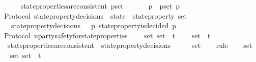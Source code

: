 \begin{isabellebody}
\ \ \isanewline
\ \ \ \ {\isachardoublequoteopen}state{\isacharunderscore}properties{\isacharunderscore}are{\isacharunderscore}consistent\ p{\isacharunderscore}set\ {\isacharequal}\ {\isacharparenleft}{\isasymexists}\ {\isasymsigma}\ {\isasymin}\ {\isasymSigma}{\isachardot}\ {\isasymforall}\ p\ {\isasymin}\ p{\isacharunderscore}set{\isachardot}\ p\ {\isasymsigma}{\isacharparenright}{\isachardoublequoteclose}\isanewline
\isanewline
\isanewline
{}\isamarkupfalse%
\ {\isacharparenleft}\ Protocol{\isacharparenright}\ state{\isacharunderscore}property{\isacharunderscore}decisions\ {\isacharcolon}{\isacharcolon}\ {\isachardoublequoteopen}state\ {\isasymRightarrow}\ state{\isacharunderscore}property\ set{\isachardoublequoteclose}\isanewline
\ \ \ \isanewline
\ \ \ \ {\isachardoublequoteopen}state{\isacharunderscore}property{\isacharunderscore}decisions\ {\isasymsigma}\ {\isacharequal}\ {\isacharbraceleft}p{\isachardot}\ state{\isacharunderscore}property{\isacharunderscore}is{\isacharunderscore}decided\ {\isacharparenleft}p{\isacharcomma}\ {\isasymsigma}{\isacharparenright}{\isacharbraceright}{\isachardoublequoteclose}\isanewline
\isanewline
\isanewline
{}\isamarkupfalse%
\ {\isacharparenleft}\ Protocol{\isacharparenright}\ n{\isacharunderscore}party{\isacharunderscore}safety{\isacharunderscore}for{\isacharunderscore}state{\isacharunderscore}properties\ {\isacharcolon}\isanewline
\ \ {\isachardoublequoteopen}{\isasymforall}\ {\isasymsigma}{\isacharunderscore}set{\isachardot}\ {\isasymsigma}{\isacharunderscore}set\ {\isasymsubseteq}\ {\isasymSigma}t\isanewline
\ \ {\isasymlongrightarrow}\ {\isasymUnion}\ {\isasymsigma}{\isacharunderscore}set\ {\isasymin}\ {\isasymSigma}t\isanewline
\ \ {\isasymlongrightarrow}\ state{\isacharunderscore}properties{\isacharunderscore}are{\isacharunderscore}consistent\ {\isacharparenleft}{\isasymUnion}\ {\isacharbraceleft}state{\isacharunderscore}property{\isacharunderscore}decisions\ {\isasymsigma}\ {\isacharbar}\ {\isasymsigma}{\isachardot}\ {\isasymsigma}\ {\isasymin}\ {\isasymsigma}{\isacharunderscore}set{\isacharbraceright}{\isacharparenright}{\isachardoublequoteclose}\isanewline
%
\isadelimproof
\ \ %
\endisadelimproof
%
\isatagproof
{}\isamarkupfalse%
\ rule{\isacharplus}\isanewline
{}\isamarkupfalse%
{\isacharminus}\isanewline
\ \ \isamarkupfalse%
\ {\isasymsigma}{\isacharunderscore}set\isanewline
\ \ \isamarkupfalse%
\ {\isasymsigma}{\isacharunderscore}set{\isacharcolon}\ {\isachardoublequoteopen}{\isasymsigma}{\isacharunderscore}set\ {\isasymsubseteq}\ {\isasymSigma}t{\isachardoublequoteclose}\isanewline

\end{isabellebody}

